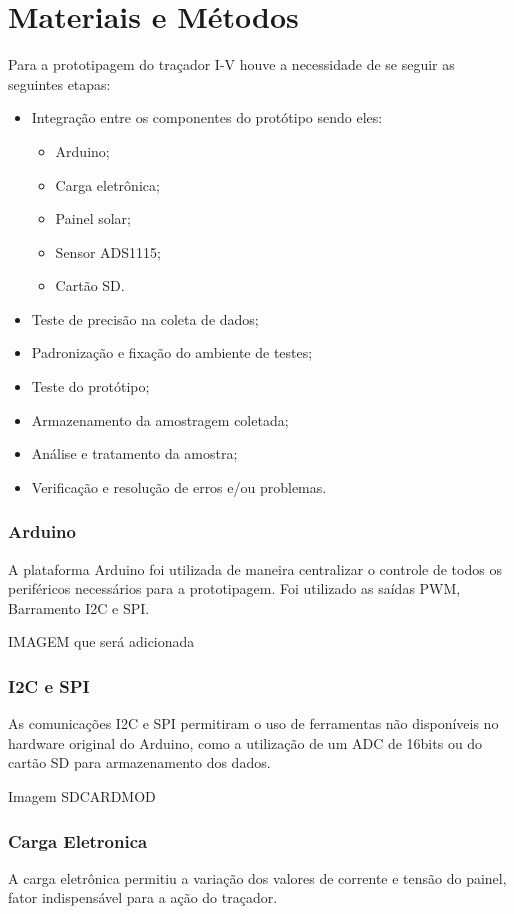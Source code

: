 \chapter{Materiais e Métodos}
\label{cap:03}

Para a prototipagem do traçador I-V houve a necessidade de se seguir as seguintes etapas:
\begin{itemize}
	\item Integração entre os componentes do protótipo sendo eles:
	\begin{itemize} 
		\item Arduino;
		\item Carga eletrônica;
		\item Painel solar;
		\item Sensor ADS1115;
		\item Cartão SD.
	\end{itemize}
	\item Teste de precisão na coleta de dados;
	\item Padronização e fixação do ambiente de testes;
	\item Teste do protótipo;
	\item Armazenamento da amostragem coletada;
	\item Análise e tratamento da amostra;
	\item Verificação e resolução de erros e/ou problemas.

\end{itemize}

\subsection{Arduino}
A plataforma Arduino foi utilizada de maneira centralizar o controle de todos os periféricos necessários para a prototipagem. Foi utilizado as saídas PWM, Barramento I2C e SPI.

IMAGEM que será adicionada

\subsection{I2C e SPI}
As comunicações I2C e SPI permitiram o uso de ferramentas não disponíveis no hardware original do Arduino, como a utilização de um ADC de 16bits ou do cartão SD para armazenamento dos dados.

Imagem SDCARDMOD

\subsection{Carga Eletronica}
A carga eletrônica permitiu a variação dos valores de corrente e tensão do painel, fator indispensável para a ação do traçador.

